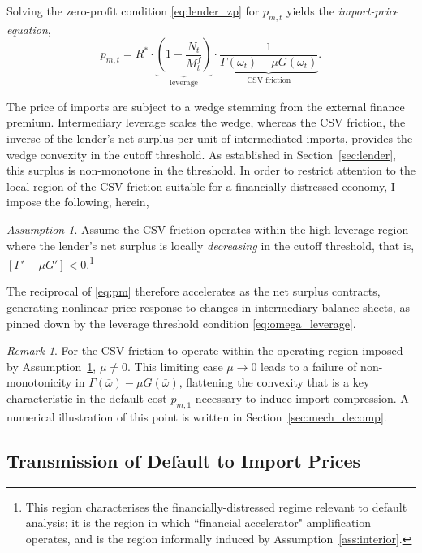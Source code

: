 \documentclass[11pt]{article}
\theoremstyle{definition}
\theoremstyle{plain}
\theoremstyle{remark}
\newtheorem{remark}{Remark}
\newtheorem{assumption}{Assumption}
\newcommand{\Rstar}{R^{*}}
\begin{document}
Solving the zero-profit condition \eqref{eq:lender_zp} for $p_{m,t}$ yields the \textit{import-price equation},
\begin{equation}\label{eq:pm}
p_{m,t} =  \Rstar \cdot \underbrace{\left(1 - \frac{N_t}{ M^f_t}\right)}_{\text{leverage}} \cdot \underbrace{\frac{1}{\Gamma(\bar{\omega}_t) - \mu G(\bar{\omega}_t)}}_{\text{CSV friction}}.
\end{equation}

The price of imports are subject to a wedge stemming from the external finance premium. Intermediary leverage scales the wedge, whereas the CSV friction, the inverse of the lender's net surplus per unit of intermediated imports, provides the wedge convexity in the cutoff threshold. As established in Section~\ref{sec:lender}, this surplus is non-monotone in the threshold. In order to restrict attention to the local region of the CSV friction suitable for a financially distressed economy, I impose the following, herein,

\begin{assumption} \label{ass:operating_region}
    Assume the CSV friction operates within the high-leverage region where the lender's net surplus is locally \textit{decreasing} in the cutoff threshold, that is, $[\Gamma' - \mu G'] < 0$.\footnote{This region characterises the financially-distressed regime relevant to default analysis; it is the region in which \citet{bernanke_chapter_1999} ``financial accelerator" amplification operates, and is the region informally induced by Assumption~\ref{ass:interior}.}
\end{assumption}

The reciprocal of \eqref{eq:pm} therefore accelerates as the net surplus contracts, generating nonlinear price response to changes in intermediary balance sheets, as pinned down by the leverage threshold condition \eqref{eq:omega_leverage}.

\begin{remark}
    For the CSV friction to operate within the operating region imposed by Assumption~\ref{ass:operating_region}, $\mu\neq0$. This limiting case $\mu \to 0$ leads to a failure of non-monotonicity in $\Gamma(\bar{\omega}) - \mu G(\bar{\omega})$, flattening the convexity that is a key characteristic in the default cost $p_{m,1}$ necessary to induce import compression. A numerical illustration of this point is written in Section~\ref{sec:mech_decomp}.
\end{remark}


\subsection{Transmission of Default to Import Prices}
\end{document}
